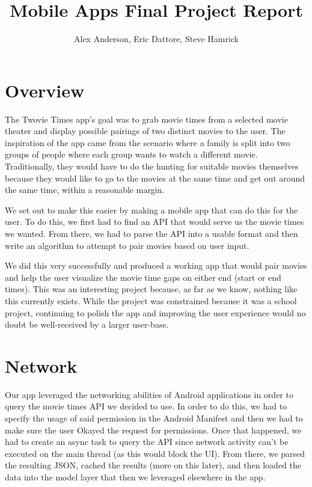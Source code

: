 \documentclass{article}
\title{Mobile Apps Final Project Report}
\author{Alex Anderson, Eric Dattore, Steve Hamrick}
\date{}
\begin{document}
    \maketitle
    \section*{Overview}
    The Twovie Times app's goal was to grab movie times from a selected movie
    theater and display possible pairings of two distinct movies to the user.
    The inspiration of the app came from the scenario where a family is split
    into two groups of people where each group wants to watch a different movie.
    Traditionally, they would have to do the hunting for suitable movies themselves
    because they would like to go to the movies at the same time and get out around
    the same time, within a reasonable margin.

    We set out to make this easier by making a mobile app that can do this for the user.
    To do this, we first had to find an API that would serve us the movie times we wanted.
    From there, we had to parse the API into a usable format and then write an algorithm to
    attempt to pair movies based on user input.

    We did this very successfully and produced a working app that would pair movies and help
    the user visualize the movie time gaps on either end (start or end times). This was an
    interesting project because, as far as we know, nothing like this currently exists. While
    the project was constrained because it was a school project, continuing to polish the app
    and improving the user experience would no doubt be well-received by a larger user-base.
    \section*{Network}
    Our app leveraged the networking abilities of Android applications in order to query the
    movie times API we decided to use. In order to do this, we had to specify the usage of
    said permission in the Android Manifest and then we had to make sure the user Okayed the
    request for permissions. Once that happened, we had to create an async task to query the
    API since network activity can't be executed on the main thread (as this would block the
    UI). From there, we parsed the resulting JSON, cached the results (more on this later),
    and then loaded the data into the model layer that then we leveraged elsewhere in the app.
\end{document}
